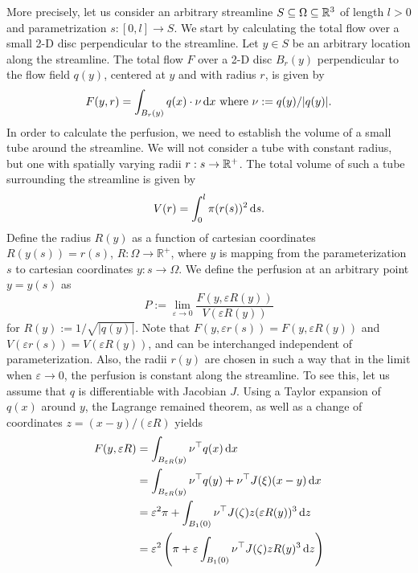\documentclass[journal,twocolumn]{IEEEtran}
\begin{document}
	More precisely, let us consider an arbitrary streamline $S \subseteq \Omega \subseteq \mathbb{R}^3$ of length $l>0$ and parametrization $s:[0,l] \to S$.
	We start by calculating the total flow over a small 2-D disc perpendicular to the streamline.
	Let $y \in S$ be an arbitrary location along the streamline. 
	The total flow $F$ over a 2-D disc $B_r(y)$ perpendicular to the flow field $q(y)$, centered at $y$ and with radius $r$, is given by
	\begin{equation}
		F(y,r) = \int_{B_r(y)} q(x) \cdot \nu \diffint x \text{ where }\nu := q(y)/\vert q(y) \vert.
		\label{eq:Fdisc}
	\end{equation}
	In order to calculate the perfusion, we need to establish the volume of a small tube around the streamline.
	We will not consider a tube with constant radius, but one with spatially varying radii $r:s \to \mathbb{R}^+$.
	The total volume of such a tube surrounding the streamline is given by
	\begin{equation}
		V(r) = \int_0^l \pi (r(s))^2 \,\mathrm{d} s.
	\end{equation}
	Define the radius $R(y)$ as a function of cartesian coordinates $R(y(s))=r(s)$, $R:\Omega \rightarrow \mathbb{R}^+$, where $y$ is mapping from the parameterization $s$ to cartesian coordinates $y: s \rightarrow \Omega$. We define the perfusion at an arbitrary point $y = y(s)$ as
	\begin{equation}
		P:=  \lim_{\varepsilon \to 0} \frac{F(y,\varepsilon R(y))}{V(\varepsilon R(y))}
	\end{equation}
	for $R(y):=1/\sqrt{\vert q(y) \vert}$. Note that $F(y,\varepsilon r(s))=F(y,\varepsilon R(y))$ and $V(\varepsilon r(s))=V(\varepsilon R(y))$, and can be interchanged independent of parameterization. Also, the radii $r(y)$ are chosen in such a way that in the limit when $\varepsilon \to 0$, the perfusion is constant along the streamline. 
	To see this, let us assume that $q$ is differentiable with Jacobian $J$.
	Using a Taylor expansion of $q(x)$ around $y$, the Lagrange remained theorem, as well as a change of coordinates $z = (x-y)/(\varepsilon R)$ yields 
	\begin{align*}
		F(y,\varepsilon R)&=\int_{B_{\varepsilon R}(y)} \nu^\top q(x) \,\mathrm{d} x \\
		&= \int_{B_{\varepsilon R}(y)} \nu^\top q(y)  + \nu^\top J(\xi) (x-y) \,\mathrm{d} x \\
		&= \varepsilon^2 \pi  + \int_{B_{1}(0)} \nu^\top J(\zeta) z(\varepsilon R(y))^3 \,\mathrm{d} z \\
		&= \varepsilon^2 \left(\pi + \varepsilon \int_{B_{1}(0)} \nu^\top J(\zeta)z R(y)^3 \,\mathrm{d} z\right)
	\end{align*}
\end{document}
